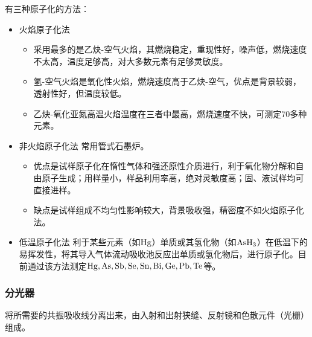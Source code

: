 有三种原子化的方法：

\begin{itemize}
	\item 火焰原子化法
	\begin{itemize}
		\item 采用最多的是乙炔-空气火焰，其燃烧稳定，重现性好，噪声低，燃烧速度不太高，温度足够高，对大多数元素有足够灵敏度。
		\item 氢-空气火焰是氧化性火焰，燃烧速度高于乙炔-空气，优点是背景较弱，透射性好，但温度较低。
		\item 乙炔-氧化亚氮高温火焰温度在三者中最高，燃烧速度不快，可测定70多种元素。
	\end{itemize}
	\item 非火焰原子化法
	常用管式石墨炉。
	\begin{itemize}
		\item 优点是试样原子化在惰性气体和强还原性介质进行，利于氧化物分解和自由原子生成；用样量小，样品利用率高，绝对灵敏度高；固、液试样均可直接进样。
		\item 缺点是试样组成不均匀性影响较大，背景吸收强，精密度不如火焰原子化法。
	\end{itemize}
	\item 低温原子化法
		利于某些元素（如$\ce{Hg}$）单质或其氢化物（如$\ce{AsH3}$）在低温下的易挥发性，将其导入气体流动吸收池反应出单质或氢化物后，进行原子化。目前通过该方法测定$\ce{Hg, As, Sb, Se, Sn, Bi, Ge, Pb, Te}$等。
\end{itemize}

\subsubsection{分光器}
将所需要的共振吸收线分离出来，由入射和出射狭缝、反射镜和色散元件（光栅）组成。

